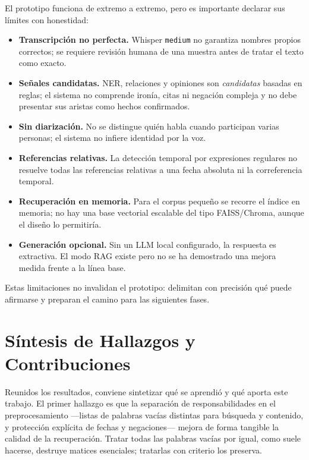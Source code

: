 \documentclass[12pt,a4paper]{article}
\begin{document}
El prototipo funciona de extremo a extremo, pero es importante declarar sus límites con honestidad:

\begin{itemize}
  \item \textbf{Transcripción no perfecta.} Whisper \texttt{medium} no garantiza nombres propios correctos; se requiere revisión humana de una muestra antes de tratar el texto como exacto.
  \item \textbf{Señales candidatas.} NER, relaciones y opiniones son \emph{candidatas} basadas en reglas; el sistema no comprende ironía, citas ni negación compleja y no debe presentar sus aristas como hechos confirmados.
  \item \textbf{Sin diarización.} No se distingue quién habla cuando participan varias personas; el sistema no infiere identidad por la voz.
  \item \textbf{Referencias relativas.} La detección temporal por expresiones regulares no resuelve todas las referencias relativas a una fecha absoluta ni la correferencia temporal.
  \item \textbf{Recuperación en memoria.} Para el corpus pequeño se recorre el índice en memoria; no hay una base vectorial escalable del tipo FAISS/Chroma, aunque el diseño lo permitiría.
  \item \textbf{Generación opcional.} Sin un LLM local configurado, la respuesta es extractiva. El modo RAG existe pero no se ha demostrado una mejora medida frente a la línea base.
\end{itemize}

Estas limitaciones no invalidan el prototipo: delimitan con precisión qué puede afirmarse y preparan el camino para las siguientes fases.


\section{Síntesis de Hallazgos y Contribuciones}
\label{sec:sintesis}

Reunidos los resultados, conviene sintetizar qué se aprendió y qué aporta este trabajo. El primer hallazgo es que la separación de responsabilidades en el preprocesamiento —listas de palabras vacías distintas para búsqueda y contenido, y protección explícita de fechas y negaciones— mejora de forma tangible la calidad de la recuperación. Tratar todas las palabras vacías por igual, como suele hacerse, destruye matices esenciales; tratarlas con criterio los preserva.
\end{document}
